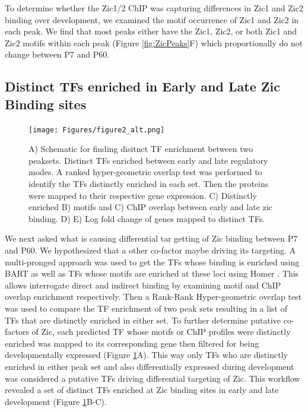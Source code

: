 \documentclass[fleqn,10pt,twocolumn]{wlscirep}
\begin{document}
To determine whether the Zic1/2 ChIP was capturing differences in Zic1 and Zic2 binding over development, we examined the motif occurrence of Zic1 and Zic2 in each peak. We find that most peaks either have the Zic1, Zic2, or both Zic1 and Zic2 motifs within each peak (Figure \ref{fig:ZicPeaks}F) which proportionally do not change between P7 and P60. 



\subsection*{Distinct TFs enriched in Early and Late Zic Binding sites}

\begin{figure}[!ht]
\centering
\texttt{[image: Figures/figure2\_alt.png]}
\caption{A) Schematic for finding disitnct TF enrichment between two peaksets. Distinct TFs enriched between early and late regulatory modes. A ranked hyper-geometric overlap test was performed to identify the TFs distinctly enriched in each set. Then the proteins were mapped to their respective gene expression. C) Distinctly enriched B) motifs and C) ChIP overlap between early and late zic binding. D) E) Log fold change of genes mapped to distinct TFs.  }
\label{fig:DistinctTFs}
\end{figure}

We next asked what is causing differential tar getting of Zic binding between P7 and P60. We hypothesized that a other co-factor maybe driving its targeting. A multi-pronged approach was used to get the TFs whose binding is enriched using BART \cite{Zhenjiawang2018BART:Profiles, Ma2021BARTweb:Analysis} as well as TFs whose motifs are enriched at these loci using Homer \cite{}. This allows interrogate direct and indirect binding by examining motif and ChIP overlap enrichment respectively. Then a Rank-Rank Hyper-geometric overlap test was used to compare the TF enrichment of two peak sets resulting in a list of TFs that are distinctly enriched in either set. To further determine putative co-factors of Zic, each predicted TF whose motifs or ChIP profiles were distinctly enriched was mapped to its corresponding gene then filtered for being developmentally expressed  (Figure \ref{fig:DistinctTFs}A). This way only TFs who are distinctly enriched in either peak set and also differentially expressed during development was considered a putative TFs driving differential targeting of Zic. This workflow revealed a set of distinct TFs enriched at Zic binding sites in early and late development (Figure \ref{fig:DistinctTFs}B-C).
\end{document}
